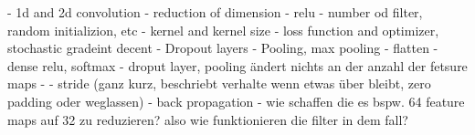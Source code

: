 - 1d and 2d convolution
- reduction of dimension
- relu 
- number od filter, random initializion, etc
- kernel and kernel size
- loss function and optimizer, stochastic gradeint decent
- Dropout layers
- Pooling, max pooling 
- flatten
- dense relu, softmax
- droput layer, pooling ändert nichts an der anzahl der fetsure maps
- 
- stride (ganz kurz, beschriebt verhalte wenn etwas über bleibt, zero padding oder weglassen)
- back propagation
- wie schaffen die es bspw. 64 feature maps auf 32 zu reduzieren? also wie funktionieren die filter in dem fall? 

  


